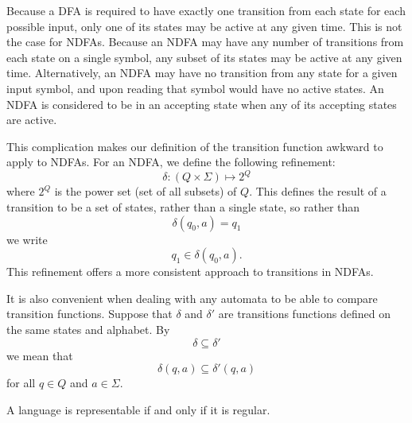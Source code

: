 \documentclass{bcthesis}
\renewcommand{\meo}[1]{}
\begin{document}
	\begin{remark}
		Because a DFA is required to have exactly one transition from each state for each possible input, only one of its states may be active at any given time.
		This is not the case for NDFAs.
		Because an NDFA may have any number of transitions from each state on a single symbol, any subset of its states may be active at any given time.
		Alternatively, an NDFA may have no transition from any state for a given input symbol, and upon reading that symbol would have no active states.
		An NDFA is considered to be in an accepting state when any of its accepting states are active.

		This complication makes our definition of the transition function awkward to apply to NDFAs.
		For an NDFA, we define the following refinement:
		\[
			\delta : (Q \times \Sigma) \mapsto 2^Q
		\]
		where $2^Q$ is the power set (set of all subsets) of $Q$.
		This defines the result of a transition to be a set of states, rather than a single state, so rather than
		\[
			\delta(q_0, a) = q_1
		\]
		we write
		\[
			q_1 \in \delta(q_0, a).
		\]
		This refinement offers a more consistent approach to transitions in NDFAs.

		It is also convenient when dealing with any automata to be able to compare transition functions.
		Suppose that $\delta$ and $\delta'$ are transitions functions defined on the same states and alphabet.
		By
		\[
			\delta \subseteq \delta'
		\]
		we mean that
		\[
			\delta(q, a) \subseteq \delta'(q, a)
		\]
		for all $q \in Q$ and $a \in \Sigma$.

		\meo{I could mention lambda transitions, but I've avoided using them so far, so I don't think I need to.}


	\end{remark}


\label{ch:kleenes_theorem}

	\begin{theorem}
		A language is representable if and only if it is regular.
	\end{theorem}
\end{document}
